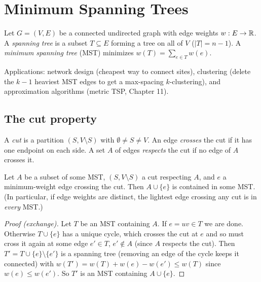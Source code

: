 \chapter{Minimum Spanning Trees}


\begin{definition}
Let $G=(V,E)$ be a connected undirected graph with edge weights $w:E\to\mathbb{R}$. A \emph{spanning tree} is a subset $T\subseteq E$ forming a tree on all of $V$
($|T|=n-1$). A \emph{minimum spanning tree} (MST) minimizes $w(T)=\sum_{e\in T}w(e)$.
\end{definition}
Applications: network design (cheapest way to connect sites), clustering (delete the $k-1$ heaviest MST edges to get a max-spacing $k$-clustering),
and approximation algorithms (metric TSP, Chapter 11).

\section{The cut property}
A \emph{cut} is a partition $(S,V\setminus S)$ with $\emptyset\ne S\ne V$. An edge \emph{crosses} the cut if it has one endpoint on each side.
A set $A$ of edges \emph{respects} the cut if no edge of $A$ crosses it.

\begin{theorem}
Let $A$ be a subset of some MST, $(S,V\setminus S)$ a cut respecting $A$, and $e$ a minimum-weight edge crossing the cut. Then $A\cup\{e\}$ is contained in
some MST. (In particular, if edge weights are distinct, the lightest edge crossing any cut is in \emph{every} MST.)
\end{theorem}
\begin{proof}[Proof (exchange)]
Let $T$ be an MST containing $A$. If $e=uv\in T$ we are done. Otherwise $T\cup\{e\}$ has a unique cycle, which crosses the cut at $e$ and so must cross it
again at some edge $e'\in T$, $e'\notin A$ (since $A$ respects the cut). Then $T'=T\cup\{e\}\setminus\{e'\}$ is a spanning tree (removing an edge of the cycle
keeps it connected) with $w(T')=w(T)+w(e)-w(e')\le w(T)$ since $w(e)\le w(e')$. So $T'$ is an MST containing $A\cup\{e\}$.
\end{proof}

